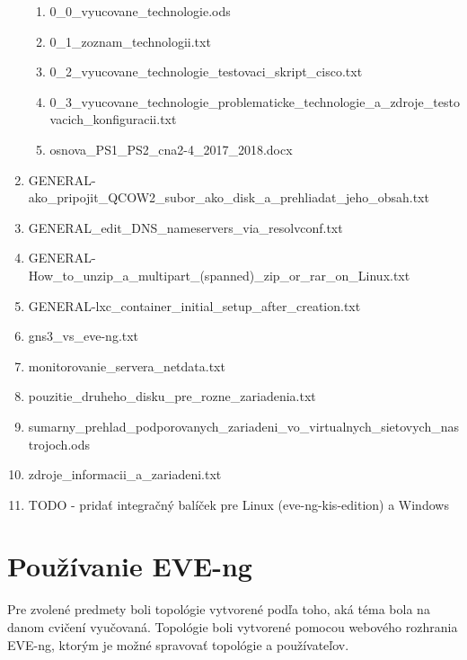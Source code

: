 \begin{enumerate}[noitemsep,label*=\thesection.\arabic*.]
\begin{enumerate}[noitemsep,label*=\arabic*.]
        \item \label{item:zoznam_technologii_s_podporou_zariadeni} 0\_0\_vyucovane\_technologie.ods
        \item \label{item:zoznam_technologii_txt} 0\_1\_zoznam\_technologii.txt
        \item \label{item:cisco_feature_testing_skript} 0\_2\_vyucovane\_technologie\_testovaci\_skript\_cisco.txt
        \item 0\_3\_vyucovane\_technologie\_problematicke\_technologie\_a\_zdroje\_testovacich\_konfiguracii.txt
        \item osnova\_PS1\_PS2\_cna2-4\_2017\_2018.docx
    \end{enumerate}
    
    \item GENERAL-ako\_pripojit\_QCOW2\_subor\_ako\_disk\_a\_prehliadat\_jeho\_obsah.txt
    \item GENERAL\_edit\_DNS\_nameservers\_via\_resolvconf.txt
    \item GENERAL-How\_to\_unzip\_a\_multipart\_(spanned)\_zip\_or\_rar\_on\_Linux.txt
    \item GENERAL-lxc\_container\_initial\_setup\_after\_creation.txt
    \item gns3\_vs\_eve-ng.txt
    \item \label{item:monitorovanie} monitorovanie\_servera\_netdata.txt
    \item pouzitie\_druheho\_disku\_pre\_rozne\_zariadenia.txt
    \item \label{item:sumarny_prehlad_zariadeni} sumarny\_prehlad\_podporovanych\_zariadeni\_vo\_virtualnych\_sietovych\_nastrojoch.ods
    \item zdroje\_informacii\_a\_zariadeni.txt
    \item {\huge TODO - pridať integračný balíček pre Linux (eve-ng-kis-edition) a Windows}
\end{enumerate}





\newpage

\section{Používanie EVE-ng}
\label{chap:pouzivanie_eve_ng}

Pre zvolené predmety boli topológie vytvorené podľa toho, aká téma bola na danom cvičení vyučovaná. Topológie boli vytvorené pomocou webového rozhrania EVE-ng, ktorým je možné spravovať topológie a používateľov.




